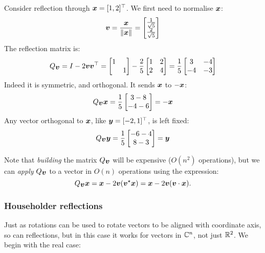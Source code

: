 \begin{example} Consider reflection through $\bm{{\mbox{\boldmath$x$\unboldmath}}} = [1,2]^\top$.  We first need to normalise $\bm{{\mbox{\boldmath$x$\unboldmath}}}$:
\[
\bm{{\mbox{\boldmath$v$\unboldmath}}} = {\bm{{\mbox{\boldmath$x$\unboldmath}}} \over \|\bm{{\mbox{\boldmath$x$\unboldmath}}}\|} = \begin{bmatrix} {1 \over \sqrt{5}} \\ {2 \over \sqrt{5}} \end{bmatrix}
\]
The reflection matrix is:
\[
Q_{\bm{{\mbox{\boldmath$v$\unboldmath}}}} = I - 2 \bm{{\mbox{\boldmath$v$\unboldmath}}} \bm{{\mbox{\boldmath$v$\unboldmath}}}^\top = \begin{bmatrix}1 \\ & 1 \end{bmatrix} - {2 \over 5} \begin{bmatrix} 1 & 2 \\ 2 & 4 \end{bmatrix}
 =  {1 \over 5} \begin{bmatrix} 3 & -4 \\ -4 & -3 \end{bmatrix}
\]
Indeed it is symmetric, and orthogonal. It sends $\bm{{\mbox{\boldmath$x$\unboldmath}}}$ to $-\bm{{\mbox{\boldmath$x$\unboldmath}}}$:
\[
Q_{\bm{{\mbox{\boldmath$v$\unboldmath}}}} \bm{{\mbox{\boldmath$x$\unboldmath}}} = {1 \over 5} \begin{bmatrix}3 - 8 \\ -4 - 6 \end{bmatrix} = -\bm{{\mbox{\boldmath$x$\unboldmath}}}
\]
Any vector orthogonal to $\bm{{\mbox{\boldmath$x$\unboldmath}}}$, like $\bm{{\mbox{\boldmath$y$\unboldmath}}} = [-2,1]^\top$, is left fixed:
\[
Q_{\bm{{\mbox{\boldmath$v$\unboldmath}}}} \bm{{\mbox{\boldmath$y$\unboldmath}}} = {1 \over 5} \begin{bmatrix}-6 -4 \\ 8 - 3 \end{bmatrix} = \bm{{\mbox{\boldmath$y$\unboldmath}}}
\]
\end{example}

Note that \emph{building} the matrix $Q_{\bm{{\mbox{\boldmath$v$\unboldmath}}}}$ will be expensive ($O(n^2)$ operations), but we can \emph{apply} $Q_{\bm{{\mbox{\boldmath$v$\unboldmath}}}}$ to a vector in $O(n)$ operations using the expression:
\[
Q_{\bm{{\mbox{\boldmath$v$\unboldmath}}}} \bm{{\mbox{\boldmath$x$\unboldmath}}} = \bm{{\mbox{\boldmath$x$\unboldmath}}} - 2 \bm{{\mbox{\boldmath$v$\unboldmath}}} (\bm{{\mbox{\boldmath$v$\unboldmath}}}^\star \bm{{\mbox{\boldmath$x$\unboldmath}}}) = \bm{{\mbox{\boldmath$x$\unboldmath}}} - 2 \bm{{\mbox{\boldmath$v$\unboldmath}}} (\bm{{\mbox{\boldmath$v$\unboldmath}}} \cdot \bm{{\mbox{\boldmath$x$\unboldmath}}}).
\]
\subsubsection{Householder reflections}
Just as rotations can be used to rotate vectors to be aligned with coordinate axis, so can reflections, but in this case it works for vectors in ${\mathbb C}^n$, not just ${\mathbb R}^2$. We begin with the real case:

